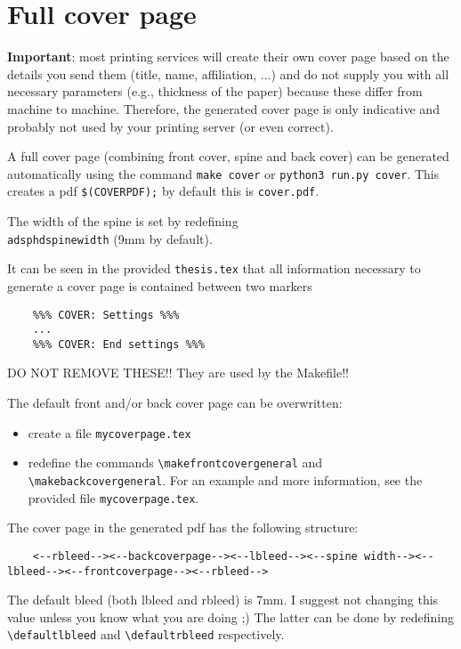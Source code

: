 \section{Full cover page}

\textbf{Important}: most printing services will create their own cover page based
on the details you send them (title, name, affiliation, ...) and do not supply
you with all necessary parameters (e.g., thickness of the paper) because these
differ from machine to machine. Therefore, the generated cover page is only
indicative and probably not used by your printing server (or even correct).


A full cover page (combining front cover, spine and back cover) can be
generated automatically using the command \texttt{make cover} or \texttt{python3 run.py cover}. This creates a pdf
\texttt{\$(COVERPDF);} by default this is \texttt{cover.pdf}.

The width of the spine is set by redefining \texttt{\\adsphdspinewidth} (9mm by default).

It can be seen in the provided \texttt{thesis.tex} that all information necessary to
generate a cover page is contained between two markers

\begin{verbatim}
    %%% COVER: Settings %%%
    ...
    %%% COVER: End settings %%%
\end{verbatim}

DO NOT REMOVE THESE!! They are used by the Makefile!!

The default front and/or back cover page can be overwritten: 

\begin{itemize}
    \item create a file \texttt{mycoverpage.tex}
    \item redefine the commands \texttt{\textbackslash makefrontcovergeneral} and \texttt{\textbackslash makebackcovergeneral}. For
          an example and more information, see the provided file \texttt{mycoverpage.tex}.
\end{itemize}

The cover page in the generated pdf has the following structure:

{\tiny
\begin{verbatim}
    <--rbleed--><--backcoverpage--><--lbleed--><--spine width--><--lbleed--><--frontcoverpage--><--rbleed-->
\end{verbatim}
}

The default bleed (both lbleed and rbleed) is 7mm. I suggest not changing this
value unless you know what you are doing ;) The latter can be done by
redefining \texttt{\textbackslash defaultlbleed} and \texttt{\textbackslash defaultrbleed} respectively.

\cleardoublepage


